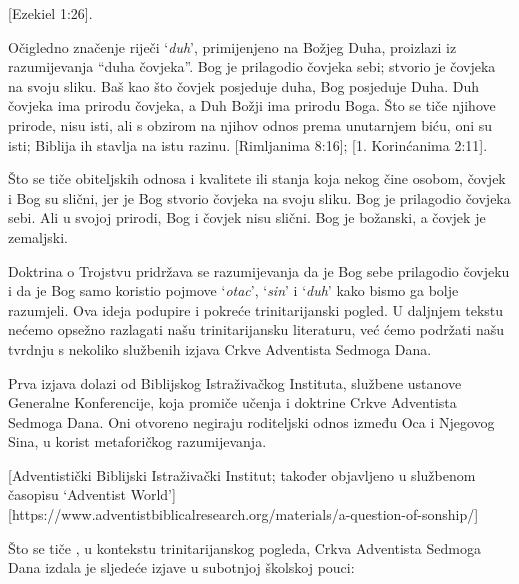 [Ezekiel 1:26].

Očigledno značenje riječi ‘\textit{duh}’, primijenjeno na Božjeg Duha, proizlazi iz razumijevanja “duha čovjeka”. Bog je prilagodio čovjeka sebi; stvorio je čovjeka na svoju sliku. Baš kao što čovjek posjeduje duha, Bog posjeduje Duha. Duh čovjeka ima prirodu čovjeka, a Duh Božji ima prirodu Boga. Što se tiče njihove prirode, nisu isti, ali s obzirom na njihov odnos prema unutarnjem biću, oni su isti; Biblija ih stavlja na istu razinu. [Rimljanima 8:16]; [1. Korinćanima 2:11].

Što se tiče obiteljskih odnosa i kvalitete ili stanja koja nekog čine osobom, čovjek i Bog su slični, jer je Bog stvorio čovjeka na svoju sliku. Bog je prilagodio čovjeka sebi. Ali u svojoj prirodi, Bog i čovjek nisu slični. Bog je božanski, a čovjek je zemaljski.

Doktrina o Trojstvu pridržava se razumijevanja da je Bog sebe prilagodio čovjeku i da je Bog samo koristio pojmove ‘\textit{otac}’, ‘\textit{sin}’ i ‘\textit{duh}’ kako bismo ga bolje razumjeli. Ova ideja podupire i pokreće trinitarijanski pogled. U daljnjem tekstu nećemo opsežno razlagati našu trinitarijansku literaturu, već ćemo podržati našu tvrdnju s nekoliko službenih izjava Crkve Adventista Sedmoga Dana.

Prva izjava dolazi od Biblijskog Istraživačkog Instituta, službene ustanove Generalne Konferencije, koja promiče učenja i doktrine Crkve Adventista Sedmoga Dana. Oni otvoreno negiraju roditeljski odnos između Oca i Njegovog Sina, u korist metaforičkog razumijevanja.

[Adventistički Biblijski Istraživački Institut; također objavljeno u službenom časopisu ‘Adventist World’][https://www.adventistbiblicalresearch.org/materials/a-question-of-sonship/]

Što se tiče , u kontekstu trinitarijanskog pogleda, Crkva Adventista Sedmoga Dana izdala je sljedeće izjave u subotnjoj školskoj pouci:

